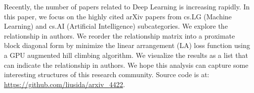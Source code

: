 Recently, the number of papers related to Deep Learning is increasing rapidly.
In this paper, we focus on the highly cited arXiv papers from cs.LG (Machine Learning) and cs.AI (Artificial Intelligence) subcategories.
We explore the relationship in authors.
We reorder the relationship matrix into a proximate block diagonal form by minimize the linear arrangement (LA) loss function using a GPU augmented hill climbing algorithm.
We visualize the results as a list that can indicate the relationship in authors.
We hope this analysis can capture some interesting structures of this research community.
Source code is at: \url{https://github.com/liusida/arxiv_4422}.
